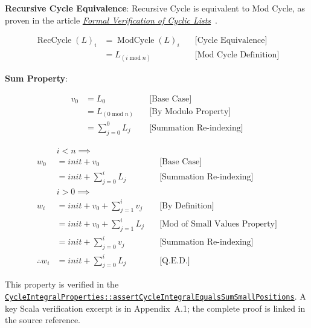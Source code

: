 \textbf{Recursive Cycle Equivalence}: Recursive Cycle is equivalent to Mod
Cycle, as proven in the article
\href{https://doi.org/10.5281/zenodo.22865441}{\emph{Formal
Verification of Cyclic Lists}}~\cite{mata2026cycle}.

\begin{equation*}
\begin{aligned}
\operatorname{RecCycle}(L)_i &=  \operatorname{ModCycle}(L)_i \quad &\text{[Cycle Equivalence]} \\
  &= L_{(i \operatorname{mod} n)} \quad &\text{[Mod Cycle Definition]}
\end{aligned}
\end{equation*}

\textbf{Sum Property}:

\begin{equation*}
\begin{aligned}
v_0  &= L_0  \quad &\text{[Base Case]} \\
&= L_{(0 \operatorname{mod} n)} \quad &\text{[By Modulo Property]} \\
&= \sum_{j=0}^0 L_j \quad &\text{[Summation Re-indexing]}
\end{aligned}
\end{equation*}

\begin{equation*}
\begin{aligned}
& i < n \implies \\
w_0 &= init + v_0 \quad &\text{[Base Case]} \\
&= init + \sum_{j=0}^i L_j  \quad &\text{[Summation Re-indexing]} \\
& i > 0 \implies \\
w_i &= init + v_0 + \sum_{j=1}^i v_j \quad &\text{[By Definition]}\\
&= init + v_0 + \sum_{j=1}^i L_j \quad &\text{[Mod of Small Values Property]} \\
&= init + \sum_{j=0}^i v_j \quad &\text{[Summation Re-indexing]} \\
\therefore w_i &= init + \sum_{j=0}^i L_j \quad &\text{[Q.E.D.]}
\end{aligned}
\end{equation*}

{\raggedright
This property is verified in the
\href{https://github.com/thiagomata/prime-numbers/blob/integral-cycle-article-v1.0.0/src/main/scala/v1/chapter4/cycle/integral/recursive/properties/CycleIntegralProperties.scala}{\texttt{CycleIntegralProperties::\allowbreak assertCycleIntegralEqualsSumSmallPositions}}.
A key Scala verification excerpt is in Appendix~A.1; the complete proof is
linked in the source reference.\par}

